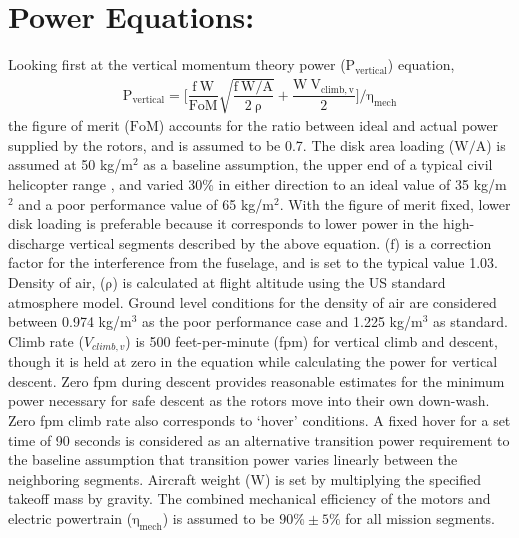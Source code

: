 \documentclass{achemso}
\begin{document}
\section*{Power Equations:}
\vspace{-0.5cm}
Looking first at the vertical momentum theory power ($\mathrm{P_{vertical}}$) equation,
\begin{gather*}
    \mathrm{P_{vertical} =  \Bigg[ \dfrac{f\ W}{FoM}\sqrt{\dfrac{f\ W/A}{2\ \rho}} + \dfrac{W\ V_{climb,v}}{2} \Bigg] / \eta_{mech}}
    \label{eqn:momVert}
\end{gather*}
\noindent the figure of merit ($\mathrm{FoM}$) accounts for the ratio between ideal and actual power supplied by the rotors, and is assumed to be 0.7\cite{Raymer}. The disk area loading ($\mathrm{W/A}$) is assumed at 50 kg/m$\mathrm{^2}$ as a baseline assumption, the upper end of a typical civil helicopter range \cite{Raymer}, and varied 30\% in either direction to an ideal value of 35 kg/m$\mathrm{^2}$ and a poor performance value of 65 kg/m$\mathrm{^2}$. With the figure of merit fixed, lower disk loading is preferable because it corresponds to lower power in the high-discharge vertical segments described by the above equation. ($\mathrm{f}$) is a correction factor for the interference from the fuselage, and is set to the typical value 1.03. \cite{Raymer} Density of air, ($\mathrm{\rho}$) is calculated at flight altitude using the US standard atmosphere model. \cite{vTechAtmos} Ground level conditions for the density of air are considered between 0.974 kg/m$\mathrm{^3}$ as the poor performance case\cite{Raymer} and 1.225 kg/m$\mathrm{^3}$ as standard.\cite{Raymer} Climb rate ($V_{climb,v}$) is 500 feet-per-minute (fpm) for vertical climb and descent, though it is held at zero in the equation while calculating the power for vertical descent. Zero fpm during descent provides reasonable estimates for the minimum power necessary for safe descent as the rotors move into their own down-wash\cite{seddon}. Zero fpm climb rate also corresponds to `hover' conditions. A fixed hover for a set time of 90 seconds is considered as an alternative transition power requirement to the baseline assumption that transition power varies linearly between the neighboring segments. Aircraft weight ($\mathrm{W}$) is set by multiplying the specified takeoff mass by gravity. The combined mechanical efficiency of the motors and electric powertrain ($\mathrm{\eta_{mech}}$) is assumed to be $\mathrm{90\% \pm5\%}$ for all mission segments. 
\newline
\end{document}

